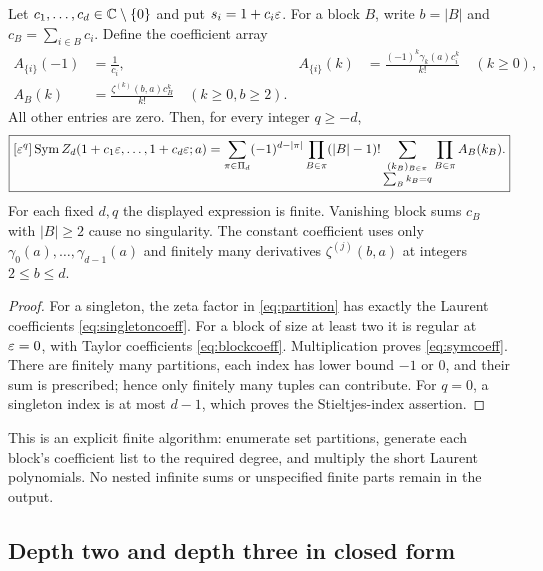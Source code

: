 \begin{theorem}
\label{thm:symcoeff}
Let $c_1,\ldots,c_d\in\mathbb C\setminus\{0\}$ and put
$s_i=1+c_i\varepsilon$. For a block $B$, write $b=|B|$ and
$c_B=\sum_{i\in B}c_i$. Define the coefficient array
\begin{align}
 A_{\{i\}}(-1)&=\frac1{c_i},&
 A_{\{i\}}(k)&=\frac{(-1)^k\gamma_k(a)c_i^k}{k!}\quad(k\ge0),
 \label{eq:singletoncoeff}\\
 A_B(k)&=\frac{\zeta^{(k)}(b,a)c_B^k}{k!}\quad(k\ge0, b\ge2).
 \label{eq:blockcoeff}
\end{align}
All other entries are zero. Then, for every integer $q\ge-d$,
\begin{equation}\label{eq:symcoeff}
 \boxed{
 [\varepsilon^q]\operatorname{Sym} Z_d(1+c_1\varepsilon,\ldots,1+c_d\varepsilon;a)
 =\sum_{\pi\in\Pi_d}(-1)^{d-|\pi|}
       \prod_{B\in\pi}(|B|-1)!
       \sum_{\substack{(k_B)_{B\in\pi}\\\sum_Bk_B=q}}
                     \prod_{B\in\pi}A_B(k_B).}
\end{equation}
For each fixed $d,q$ the displayed expression is finite. Vanishing
block sums $c_B$ with $|B|\ge2$ cause no singularity. The constant
coefficient uses only $\gamma_0(a),\ldots,\gamma_{d-1}(a)$ and
finitely many derivatives $\zeta^{(j)}(b,a)$ at integers $2\le b\le d$.
\end{theorem}
\begin{proof}
For a singleton, the zeta factor in \eqref{eq:partition} has exactly
the Laurent coefficients \eqref{eq:singletoncoeff}. For a block of
size at least two it is regular at $\varepsilon=0$, with Taylor coefficients
\eqref{eq:blockcoeff}. Multiplication proves \eqref{eq:symcoeff}.
There are finitely many partitions, each index has lower bound $-1$
or $0$, and their sum is prescribed; hence only finitely many tuples
can contribute. For $q=0$, a singleton index is at most $d-1$,
which proves the Stieltjes-index assertion.
\end{proof}

This is an explicit finite algorithm: enumerate set partitions,
generate each block's coefficient list to the required degree, and
multiply the short Laurent polynomials. No nested infinite sums or
unspecified finite parts remain in the output.

\subsection{Depth two and depth three in closed form}

